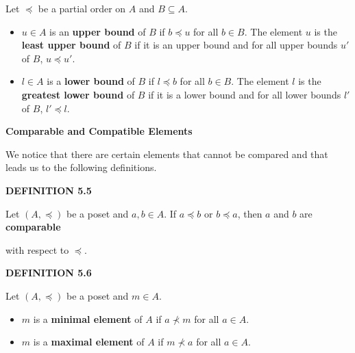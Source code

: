 \documentclass[12pt, a4paper]{article}
\begin{document}
\vspace{4mm}

Let $\preceq$ be a partial order on $A$ and $B\subseteq A$.

\begin{itemize}
    
    \item $u\in A$ is an \textbf{upper bound} of $B$ if $b\preceq u$ for all $b\in B$. The element $u$ is the \textbf{least upper bound} of $B$ if it is an upper bound and for all upper bounds $u'$ of $B$, $u\preceq u'$.
    
    \item $l\in A$ is a \textbf{lower bound} of $B$ if $l\preceq b$ for all $b\in B$. The element $l$ is the \textbf{greatest lower bound} of $B$ if it is a lower bound and for all lower bounds $l'$ of $B$, $l'\preceq l$.
    
\end{itemize}

\noindent\large\textbf{Comparable and Compatible Elements}\normalsize\par

\vspace{4mm}

\noindent We notice that there are certain elements that cannot be compared and that leads us to the following definitions.\par

\vspace{4mm}

\noindent\blacksquare\textbf{ DEFINITION 5.5}\par

\vspace{4mm}

Let $(A,\preceq)$ be a poset and $a,b\in A$. If $a\preceq b$ or $b\preceq a$, then $a$ and $b$ are \textbf{comparable}\par with respect to $\preceq$.

\vspace{4mm}

\noindent\blacksquare\textbf{ DEFINITION 5.6}\par

\vspace{4mm}

Let $(A,\preceq)$ be a poset and $m\in A$.

\begin{itemize}
    
    \item $m$ is a \textbf{minimal element} of $A$ if $a\nprec m$ for all $a\in A$.
    
    \item $m$ is a \textbf{maximal element} of $A$ if $m\nprec a$ for all $a\in A$.
    
\end{itemize}
\end{document}

